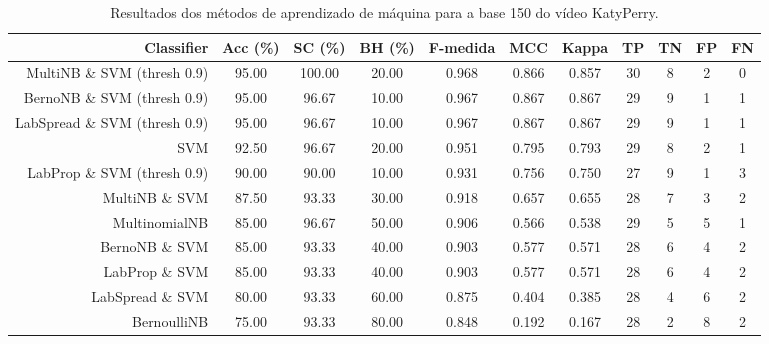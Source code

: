 \begin{table}[!htb]
\centering
\caption{Resultados dos métodos de aprendizado de máquina para a base 150 do vídeo KatyPerry.}
\label{tab:KatyPerry-150}
\begin{tabular}{r|c|c|c|c|c|c|c|c|c|c}
\hline\hline
Classifier & Acc (\%) & SC (\%) & BH (\%) & F-medida & MCC & Kappa & TP & TN & FP & FN \\ \hline
MultiNB \& SVM (thresh 0.9) & 95.00 & 100.00 & 20.00 & 0.968 & 0.866 & 0.857 & 30 & 8 & 2 & 0 \\ 
BernoNB \& SVM (thresh 0.9) & 95.00 & 96.67 & 10.00 & 0.967 & 0.867 & 0.867 & 29 & 9 & 1 & 1 \\ 
LabSpread \& SVM (thresh 0.9) & 95.00 & 96.67 & 10.00 & 0.967 & 0.867 & 0.867 & 29 & 9 & 1 & 1 \\ 
SVM & 92.50 & 96.67 & 20.00 & 0.951 & 0.795 & 0.793 & 29 & 8 & 2 & 1 \\ 
LabProp \& SVM (thresh 0.9) & 90.00 & 90.00 & 10.00 & 0.931 & 0.756 & 0.750 & 27 & 9 & 1 & 3 \\ 
MultiNB \& SVM & 87.50 & 93.33 & 30.00 & 0.918 & 0.657 & 0.655 & 28 & 7 & 3 & 2 \\ 
MultinomialNB & 85.00 & 96.67 & 50.00 & 0.906 & 0.566 & 0.538 & 29 & 5 & 5 & 1 \\ 
BernoNB \& SVM & 85.00 & 93.33 & 40.00 & 0.903 & 0.577 & 0.571 & 28 & 6 & 4 & 2 \\ 
LabProp \& SVM & 85.00 & 93.33 & 40.00 & 0.903 & 0.577 & 0.571 & 28 & 6 & 4 & 2 \\ 
LabSpread \& SVM & 80.00 & 93.33 & 60.00 & 0.875 & 0.404 & 0.385 & 28 & 4 & 6 & 2 \\ 
BernoulliNB & 75.00 & 93.33 & 80.00 & 0.848 & 0.192 & 0.167 & 28 & 2 & 8 & 2 \\ 
\hline\hline
\end{tabular}
\end{table}
